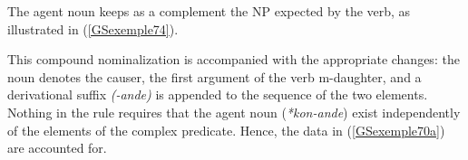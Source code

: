\documentclass[output=paper
                ,modfonts
                ,nonflat
	        ,collection
	        ,collectionchapter
	        ,collectiontoclongg
 	        ,biblatex
                ,babelshorthands
                ,newtxmath
                ,draftmode
                ,colorlinks, citecolor=brown
]{./langsci/langscibook}
\begin{document}
{
\begin{exe}
\end{exe}

The agent noun keeps as a complement the NP expected by the verb, as illustrated in (\ref{GSexemple74}).   

\begin{exe}
	\label{GSexemple74}

\end{exe}

This compound nominalization is accompanied with the appropriate changes: the noun denotes the causer, the first argument of the verb m-daughter, and a derivational suffix \emph{(-ande)} is appended to the sequence of the two elements. Nothing in the rule requires that the agent noun (\emph{*kon-ande}) exist independently of the elements of the complex predicate. Hence, the data in (\ref{GSexemple70a}) are accounted for.

}
\end{document}
